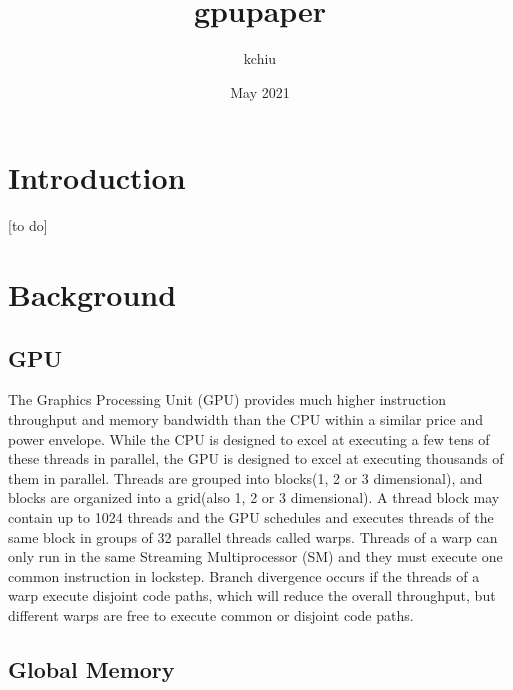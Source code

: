 \documentclass[conference]{IEEEtran}
\title{gpupaper}
\author{kchiu }
\date{May 2021}
\begin{document}
\maketitle
\section{Introduction}
[to do]
\section{Background}
\subsection{GPU}
The Graphics Processing Unit (GPU) provides much higher instruction throughput and memory bandwidth than the CPU within a similar price and power envelope\cite{b1}. While the CPU is designed to excel at executing a few tens of these threads in parallel, the GPU is designed to excel at executing thousands of them in parallel\cite{b1}\cite{b2}. Threads are grouped into blocks(1, 2 or 3 dimensional), and blocks are organized into a grid(also 1, 2 or 3 dimensional). A thread block may contain up to 1024 threads and the GPU schedules and executes threads of the same block in groups of 32 parallel threads called warps\cite{b1}. Threads of a warp can only run in the same Streaming Multiprocessor (SM) and they must execute one common instruction in lockstep. Branch divergence occurs if the threads of a warp execute disjoint code paths, which will reduce the overall throughput, but different warps are free to execute common or disjoint code paths. 


\subsection{Global Memory}
 
\end{document}
